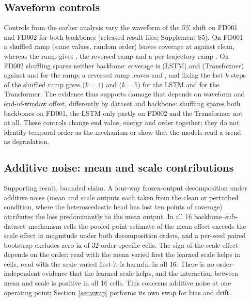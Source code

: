 \subsection{Waveform controls}\label{sec:controls}
Controls from the earlier analysis vary the waveform of the 5\% shift on FD001 and FD002 for both backbones (released result files; Supplement S5). On FD001 a shuffled ramp (same values, random order) leaves coverage at \JWFoneShuf{} against \JWFoneClean{} clean, whereas the ramp gives \JWFoneRamp{}, the reversed ramp \JWFoneRev{} and a per-trajectory ramp \JWFoneCont. On FD002 shuffling spares neither backbone: coverage is \JWFtwoShufL{} (LSTM) and \JWFtwoShufT{} (Transformer) against \NRampL{} and \NRampT{} for the ramp; a reversed ramp leaves \NRevL{} and \NRevT, and fixing the last $k$ steps of the shuffled ramp gives \NFixEndOneL{} ($k=1$) and \NFixEndFiveL{} ($k=5$) for the LSTM and \NFixEndT{} for the Transformer. The evidence thus supports damage that depends on waveform and end-of-window offset, differently by dataset and backbone: shuffling spares both backbones on FD001, the LSTM only partly on FD002 and the Transformer not at all. These controls change end value, energy and order together; they do not identify temporal order as the mechanism or show that the models read a trend as degradation.

\subsection{Additive noise: mean and scale contributions}\label{sec:noise}
Supporting result, bounded claim. A four-way frozen-output decomposition under additive noise (mean and scale outputs each taken from the clean or perturbed condition, where the heteroscedastic head has lost ten points of coverage) attributes the loss predominantly to the mean output. In all 16 backbone--sub-dataset--mechanism cells the pooled point estimate of the mean effect exceeds the scale effect in magnitude under both decomposition orders, and a per-seed paired bootstrap excludes zero in \NCITot{} of 32 order-specific cells. The sign of the scale effect depends on the order: read with the mean varied first the learned scale helps in \NHelpA{} cells, read with the scale varied first it is harmful in all 16. There is no order-independent evidence that the learned scale helps, and the interaction between mean and scale is positive in all 16 cells. This concerns additive noise at one operating point; Section~\ref{sec:swap} performs its own swap for bias and drift.
